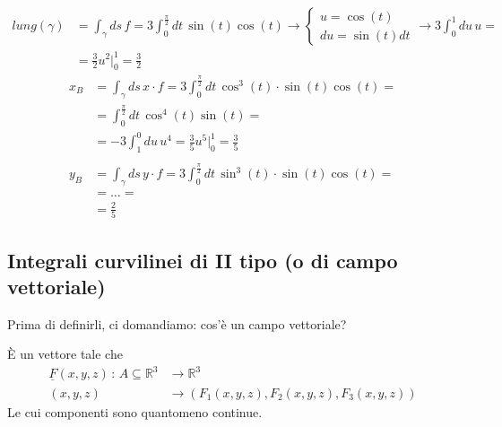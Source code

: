 	\begin{figure}[!htb]
	\end{figure}
\begin{align}
lung(\gamma){}&= \int_{\gamma}ds \, f = 3 \int_{0}^{\frac{\pi}{2}} dt \, \sin(t)\cos(t)\rightarrow \left\{
\begin{array}{cc}
u=\cos(t)\\
du=\sin(t)dt
\end{array}
\right. \rightarrow 3\int_{0}^{1} du \, u = \nonumber\\
&=\frac{3}{2}u^2|_{0}^{1}=\frac{3}{2}
\end{align}	
\begin{align}
x_B {}&= \int_{\gamma}ds \, x\cdot f = 3 \int_{0}^{\frac{\pi}{2}} dt \, \cos^3(t)\cdot \sin(t)\cos(t) = \nonumber \\
&= \int_{0}^{\frac{\pi}{2}} dt \, \cos^4(t)\sin(t) = \nonumber \\
&= - 3 \int_{1}^{0} du \, u^4 = \frac{3}{5}u^5|_{0}^{1}= \frac{3}{5} \\
\nonumber \\
y_B &= \int_{\gamma}ds \, y\cdot f= 3 \int_{0}^{\frac{\pi}{2}} dt \, \sin^3(t)\cdot \sin(t)\cos(t)=\nonumber \\
&= \dots = \nonumber \\
&= \frac{2}{5}
\end{align}
	
\subsection{Integrali curvilinei di II tipo (o di campo vettoriale)}

Prima di definirli, ci domandiamo: cos'è un campo vettoriale?

È un vettore tale che
\begin{align}
\underline{F}(x,y,z)\, : \, A \subseteq \mathbb{R}^3 {}&\longrightarrow \mathbb{R}^3 \\
(x,y,z) &\longrightarrow (F_1(x,y,z),F_2(x,y,z),F_3(x,y,z)) \nonumber
\end{align}
Le cui componenti sono quantomeno continue.


